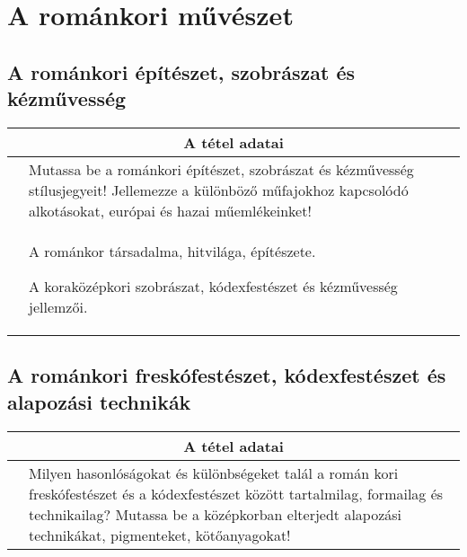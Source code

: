 \chapter{A románkori művészet} %
\label{ch:5_romankor}

\section{A románkori építészet, szobrászat és kézművesség}

\begin{center}
	\begin{longtable}{ | p{} | p{} | }
		
		\hline
		\multicolumn{2}{|c|}{\textbf{A tétel adatai}}
		\\ \hline
		
		\hline
		\centering{Tétel teljes címe}
		&
		Mutassa be a románkori építészet, szobrászat és kézművesség stílusjegyeit! Jellemezze a különböző műfajokhoz kapcsolódó alkotásokat, európai és hazai műemlékeinket!
		\\ \hline
		
		\centering{Jegyzetek}
		&
		\begin{compactitem}
			\item A románkor társadalma, hitvilága, építészete.
			\item A koraközépkori szobrászat, kódexfestészet és kézművesség jellemzői.
		\end{compactitem}
		\\\hline
		
	\end{longtable}
\end{center}

\cleardoublepage


\section{A románkori freskófestészet, kódexfestészet és alapozási technikák}

\begin{center}
	\begin{longtable}{ | p{} | p{} | }
		
		\hline
		\multicolumn{2}{|c|}{\textbf{A tétel adatai}}
		\\ \hline
		
		\hline
		\centering{Tétel teljes címe}
		&
		Milyen hasonlóságokat és különbségeket talál a román kori freskófestészet és a kódexfestészet között tartalmilag, formailag és technikailag? Mutassa be a középkorban elterjedt alapozási technikákat, pigmenteket, kötőanyagokat!
		\\ \hline
		
	\end{longtable}
\end{center}